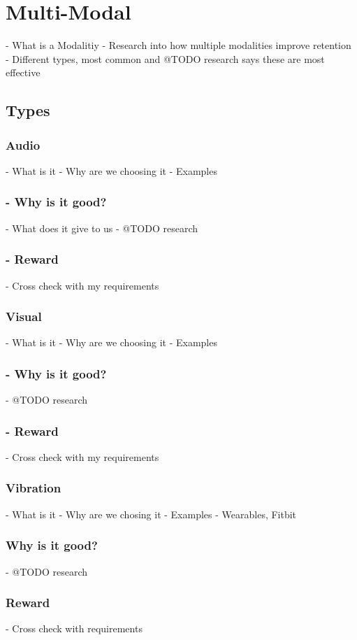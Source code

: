 \newpage

\section{Multi-Modal}
  - What is a Modalitiy
  - Research into how multiple modalities improve retention
  - Different types, most common and @TODO research says these are most effective
  \subsection{Types}
  \subsubsection{Audio}
      - What is it
      - Why are we choosing it
      - Examples
      \subsubsection{- Why is it good?}
        - What does it give to us
        - @TODO research
      \subsubsection{- Reward}
        - Cross check with my requirements
  \subsubsection{Visual}
      - What is it
      - Why are we choosing it
      - Examples
      \subsubsection{- Why is it good?}
        - @TODO research
      \subsubsection{- Reward}
        - Cross check with my requirements
  \subsubsection{Vibration}
      - What is it
      - Why are we chosing it
      - Examples
      - Wearables, Fitbit
    \subsubsection{Why is it good?}
        - @TODO research
    \subsubsection{Reward}
        - Cross check with requirements

